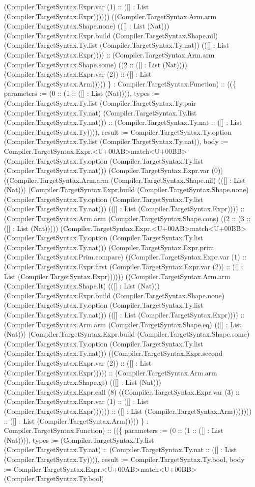 \documentclass[11pt]{article}
\begin{document}
(Compiler.TargetSyntax.Expr.var (1) :: ([] : List (Compiler.TargetSyntax.Expr)))))) ((Compiler.TargetSyntax.Arm.arm (Compiler.TargetSyntax.Shape.none) (([] : List (Nat))) (Compiler.TargetSyntax.Expr.build (Compiler.TargetSyntax.Shape.nil) (Compiler.TargetSyntax.Ty.list (Compiler.TargetSyntax.Ty.nat)) (([] : List (Compiler.TargetSyntax.Expr)))) :: (Compiler.TargetSyntax.Arm.arm (Compiler.TargetSyntax.Shape.some) ((2 :: ([] : List (Nat)))) (Compiler.TargetSyntax.Expr.var (2)) :: ([] : List (Compiler.TargetSyntax.Arm))))) \} : Compiler.TargetSyntax.Function) :: ((\{ parameters := (0 :: (1 :: ([] : List (Nat)))), types := (Compiler.TargetSyntax.Ty.list (Compiler.TargetSyntax.Ty.pair (Compiler.TargetSyntax.Ty.nat) (Compiler.TargetSyntax.Ty.list (Compiler.TargetSyntax.Ty.nat))) :: (Compiler.TargetSyntax.Ty.nat :: ([] : List (Compiler.TargetSyntax.Ty)))), result := Compiler.TargetSyntax.Ty.option (Compiler.TargetSyntax.Ty.list (Compiler.TargetSyntax.Ty.nat)), body := Compiler.TargetSyntax.Expr.<U+00AB>match<U+00BB> (Compiler.TargetSyntax.Ty.option (Compiler.TargetSyntax.Ty.list (Compiler.TargetSyntax.Ty.nat))) (Compiler.TargetSyntax.Expr.var (0)) ((Compiler.TargetSyntax.Arm.arm (Compiler.TargetSyntax.Shape.nil) (([] : List (Nat))) (Compiler.TargetSyntax.Expr.build (Compiler.TargetSyntax.Shape.none) (Compiler.TargetSyntax.Ty.option (Compiler.TargetSyntax.Ty.list (Compiler.TargetSyntax.Ty.nat))) (([] : List (Compiler.TargetSyntax.Expr)))) :: (Compiler.TargetSyntax.Arm.arm (Compiler.TargetSyntax.Shape.cons) ((2 :: (3 :: ([] : List (Nat))))) (Compiler.TargetSyntax.Expr.<U+00AB>match<U+00BB> (Compiler.TargetSyntax.Ty.option (Compiler.TargetSyntax.Ty.list (Compiler.TargetSyntax.Ty.nat))) (Compiler.TargetSyntax.Expr.prim (Compiler.TargetSyntax.Prim.compare) ((Compiler.TargetSyntax.Expr.var (1) :: (Compiler.TargetSyntax.Expr.first (Compiler.TargetSyntax.Expr.var (2)) :: ([] : List (Compiler.TargetSyntax.Expr)))))) ((Compiler.TargetSyntax.Arm.arm (Compiler.TargetSyntax.Shape.lt) (([] : List (Nat))) (Compiler.TargetSyntax.Expr.build (Compiler.TargetSyntax.Shape.none) (Compiler.TargetSyntax.Ty.option (Compiler.TargetSyntax.Ty.list (Compiler.TargetSyntax.Ty.nat))) (([] : List (Compiler.TargetSyntax.Expr)))) :: (Compiler.TargetSyntax.Arm.arm (Compiler.TargetSyntax.Shape.eq) (([] : List (Nat))) (Compiler.TargetSyntax.Expr.build (Compiler.TargetSyntax.Shape.some) (Compiler.TargetSyntax.Ty.option (Compiler.TargetSyntax.Ty.list (Compiler.TargetSyntax.Ty.nat))) ((Compiler.TargetSyntax.Expr.second (Compiler.TargetSyntax.Expr.var (2)) :: ([] : List (Compiler.TargetSyntax.Expr))))) :: (Compiler.TargetSyntax.Arm.arm (Compiler.TargetSyntax.Shape.gt) (([] : List (Nat))) (Compiler.TargetSyntax.Expr.call (8) ((Compiler.TargetSyntax.Expr.var (3) :: (Compiler.TargetSyntax.Expr.var (1) :: ([] : List (Compiler.TargetSyntax.Expr)))))) :: ([] : List (Compiler.TargetSyntax.Arm))))))) :: ([] : List (Compiler.TargetSyntax.Arm))))) \} : Compiler.TargetSyntax.Function) :: ((\{ parameters := (0 :: (1 :: ([] : List (Nat)))), types := (Compiler.TargetSyntax.Ty.list (Compiler.TargetSyntax.Ty.nat) :: (Compiler.TargetSyntax.Ty.nat :: ([] : List (Compiler.TargetSyntax.Ty)))), result := Compiler.TargetSyntax.Ty.bool, body := Compiler.TargetSyntax.Expr.<U+00AB>match<U+00BB> (Compiler.TargetSyntax.Ty.bool) 
\end{document}
